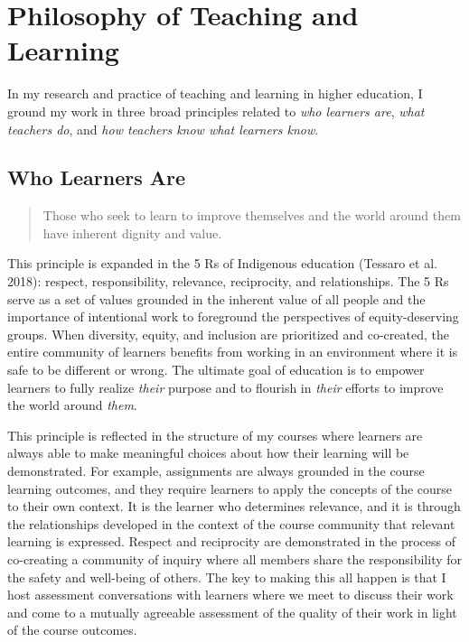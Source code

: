\documentclass[
  letterpaper,
  DIV=11,
  numbers=noendperiod]{scrartcl}
\author{}
\date{}
\begin{document}
\section{Philosophy of Teaching and
Learning}\label{philosophy-of-teaching-and-learning}

In my research and practice of teaching and learning in higher
education, I ground my work in three broad principles related to
\emph{who learners are}, \emph{what teachers do}, and \emph{how teachers
know what learners know}.

\subsection{Who Learners Are}\label{who-learners-are}

\begin{quote}
Those who seek to learn to improve themselves and the world around them
have inherent dignity and value.
\end{quote}

This principle is expanded in the 5 Rs of Indigenous education (Tessaro
et al. 2018): respect, responsibility, relevance, reciprocity, and
relationships. The 5 Rs serve as a set of values grounded in the
inherent value of all people and the importance of intentional work to
foreground the perspectives of equity-deserving groups. When diversity,
equity, and inclusion are prioritized and co-created, the entire
community of learners benefits from working in an environment where it
is safe to be different or wrong. The ultimate goal of education is to
empower learners to fully realize \emph{their} purpose and to flourish
in \emph{their} efforts to improve the world around \emph{them}.

This principle is reflected in the structure of my courses where
learners are always able to make meaningful choices about how their
learning will be demonstrated. For example, assignments are always
grounded in the course learning outcomes, and they require learners to
apply the concepts of the course to their own context. It is the learner
who determines relevance, and it is through the relationships developed
in the context of the course community that relevant learning is
expressed. Respect and reciprocity are demonstrated in the process of
co-creating a community of inquiry where all members share the
responsibility for the safety and well-being of others. The key to
making this all happen is that I host assessment conversations with
learners where we meet to discuss their work and come to a mutually
agreeable assessment of the quality of their work in light of the course
outcomes.
\end{document}
